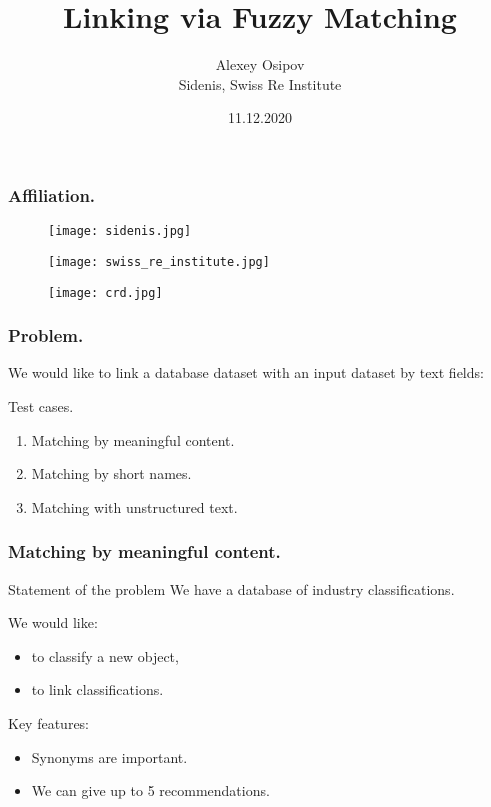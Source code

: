 \documentclass{beamer}
\title{Linking via Fuzzy Matching}
\author{Alexey Osipov \\ Sidenis, Swiss Re Institute}
\date{11.12.2020}
\begin{document}
\maketitle
\begin{frame}[fragile]
\frametitle{Affiliation.}
\begin{figure}[h!]
\centering
\texttt{[image: sidenis.jpg]}
\end{figure}
\begin{figure}[h!]
\centering
\texttt{[image: swiss\_re\_institute.jpg]}
\end{figure}
\begin{figure}[h!]
\centering
\texttt{[image: crd.jpg]}
\end{figure}
\end{frame}
\begin{frame}[fragile]
\frametitle{Problem.}
We would like to link a database dataset with an input dataset by text fields:

\begin{block}{Test cases.}
\begin{enumerate}
	\item Matching by meaningful content.
	\item Matching by short names.
	\item Matching with unstructured text.
\end{enumerate}
\end{block}

\end{frame}
\begin{frame}[fragile]
\frametitle{Matching by meaningful content.}
\begin{block}{Statement of the problem}
We have a database of industry classifications.

We would like:
\begin{itemize}
	\item to classify a new object,
	\item to link classifications.
\end{itemize}
\end{block}

\begin{block}{Key features:}
\begin{itemize}
	\item Synonyms are important.
	\item We can give up to 5 recommendations.
\end{itemize}
\end{block}
\end{frame}
\end{document}

